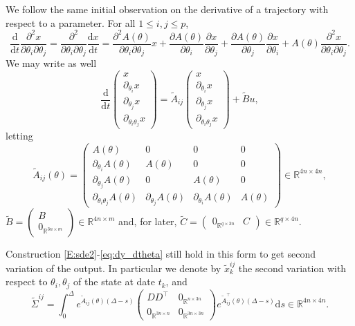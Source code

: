 \documentclass[a4paper]{article}
\theoremstyle{definition}
\theoremstyle{remark}
\newcommand{\R}{\mathbb{R}}
\newcommand{\diff}{\mathrm{d}}
\begin{document}
We follow the same initial observation on the derivative of a trajectory with respect to a parameter. For all $1\leq i,j\leq p$,
$$
\frac{\diff}{\diff t} \frac{\partial^2 x}{\partial \theta_i\partial \theta_j}
= 
\frac{\partial^2 }{\partial \theta_i\partial \theta_j} \frac{\diff x}{\diff t}
= 
\frac{\partial^2  A(\theta)}{\partial \theta_i\partial \theta_j}x +
\frac{\partial  A(\theta)}{\partial \theta_i}\frac{\partial  x}{\partial \theta_j} +
\frac{\partial  A(\theta)}{\partial \theta_j}\frac{\partial  x}{\partial \theta_i} +
A(\theta)   \frac{\partial^2 x}{\partial \theta_i\partial \theta_j}.
$$
We may write as well
$$
\frac{\diff}{\diff t}
\begin{pmatrix}
x
\\
\partial_{\theta_i} x
\\
\partial_{\theta_j} x
\\
\partial_{\theta_i\theta_j} x
\end{pmatrix}
=
\tilde A_{ij}
\begin{pmatrix}
x
\\
\partial_{\theta_i} x
\\
\partial_{\theta_j} x
\\
\partial_{\theta_i\theta_j} x
\end{pmatrix}
+
\tilde B u,
$$
letting 
$$
\tilde A_{ij}(\theta)=\begin{pmatrix}
    A(\theta) & 0 & 0 & 0
    \\
    \partial_{\theta_i}A(\theta) & A(\theta)& 0 & 0
    \\
    \partial_{\theta_j}A(\theta) & 0 & A(\theta) & 0
    \\
    \partial_{\theta_i\theta_j}A(\theta) &\partial_{\theta_j}A(\theta) & \partial_{\theta_i}A(\theta) & A(\theta)
\end{pmatrix}\in \R^{4n\times 4n},
$$
$\tilde B=\begin{pmatrix}
    B
    \\
    0_{\R^{3n\times m}}
    \end{pmatrix}\in \R^{4n\times m}$ and, for later, $\tilde C=\begin{pmatrix}
0_{\R^{q\times 3n}}&C
\end{pmatrix}\in \R^{q\times 4n}$.

Construction \eqref{E:sde2}-\eqref{eq:dy_dtheta} still hold in this form to get second variation of the output. In particular we denote by $\tilde x^{ij}_k$ the second variation with respect to $\theta_i,\theta_j$ of the state at date $t_k$, and 
$$
\tilde\Sigma^{ij} = \int_0^\Delta e^{\tilde A_{ij}(\theta)(\Delta-s)}
\begin{pmatrix}
D D^\top  & 0_{\R^{n\times 3n}}
\\
 0_{\R^{3n\times n}} & 0_{\R^{3n\times 3n}}
\end{pmatrix} 
e^{\tilde A_{ij}^\top(\theta)(\Delta-s)}\diff s\in \R^{4n\times 4n}.
$$
\end{document}
